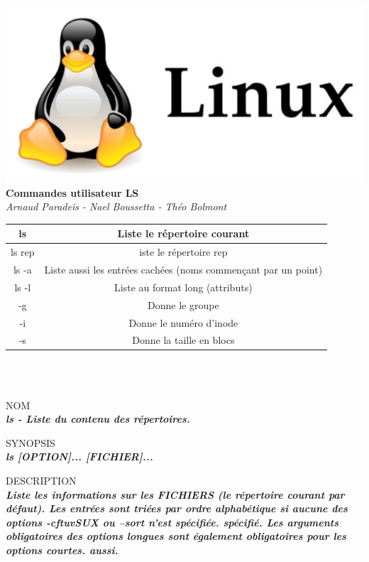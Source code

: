 \documentclass{article}
\begin{document}
\begin{center}
\includegraphics[scale=0.2]{image/linux.jpg}
\huge  \textbf{Commandes utilisateur LS } \\


\normalsize \textit {Arnaud Paradeis - Nael Boussetta - Théo Bolmont}\\[4cm]
\end{center}


\begin{tabular}{| c | c | }
     \hline
      ls& Liste le répertoire courant\\ \hline
     ls rep&iste le répertoire rep \\ \hline
      ls -a& Liste aussi les entrées cachées (noms commençant par un point)\\ \hline
      ls -l&Liste au format long (attributs)\\ \hline
      -g& Donne le groupe   \\ \hline
      -i& Donne le numéro d'inode \\ \hline
      -s& Donne la taille en blocs   \\ \hline
   \end{tabular}
\\
\\


\par NOM\\
		\textit{\textbf{ls - Liste du contenu des répertoires.}}\\
\par SYNOPSIS\\
		\textit{\textbf{ls [OPTION]... [FICHIER]...}}\\
\par DESCRIPTION\\
		\textit{\textbf{Liste les informations sur les FICHIERS (le répertoire courant par défaut).
       Les entrées sont triées par ordre alphabétique si aucune des options -cftuvSUX ou --sort n'est spécifiée.
       spécifié. Les arguments obligatoires des options longues sont également obligatoires pour les options courtes.
       aussi.}}\\
\end{document}
